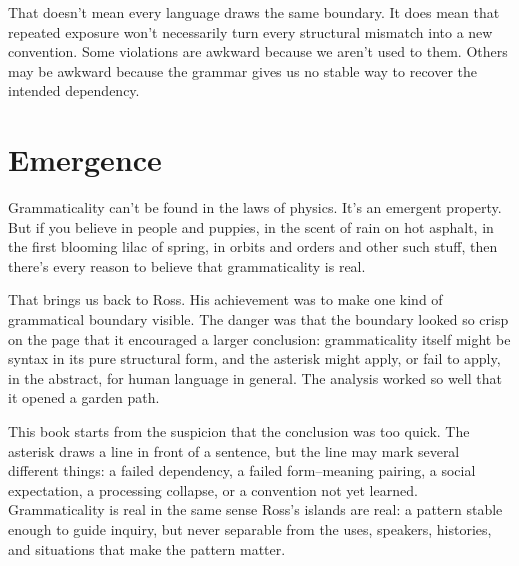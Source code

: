 That doesn't mean every language draws the same boundary. It does mean
that repeated exposure won't necessarily turn every structural mismatch
into a new convention. Some violations are awkward because we aren't used
to them. Others may be awkward because the grammar gives us no stable way
to recover the intended dependency.


\section{Emergence}

Grammaticality can't be found in the laws of physics. It's an emergent
property. But if you believe in people and puppies, in the scent of rain
on hot asphalt, in the first blooming lilac of spring, in orbits and
orders and other such stuff, then there's every reason to believe that
grammaticality is real.

That brings us back to Ross. His achievement was to make one kind of
grammatical boundary visible. The danger was that the boundary looked so
crisp on the page that it encouraged a larger conclusion: grammaticality
itself might be syntax in its pure structural form, and the asterisk
might apply, or fail to apply, in the abstract, for human language in
general. The analysis worked so well that it opened a garden path.

This book starts from the suspicion that the conclusion was too quick.
The asterisk draws a line in front of a sentence, but the line may mark
several different things: a failed dependency, a failed form--meaning
pairing, a social expectation, a processing collapse, or a convention not
yet learned. Grammaticality is real in the same sense Ross's islands are
real: a pattern stable enough to guide inquiry, but never separable from
the uses, speakers, histories, and situations that make the pattern
matter.

